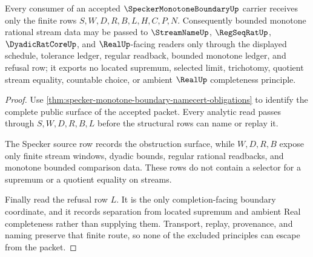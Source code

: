 \begin{theorem}
\label{thm:specker-monotone-boundary-nonescape}
Every consumer of an accepted $\SpeckerMonotoneBoundaryUp$ carrier receives only the finite rows $S,W,D,R,B,L,H,C,P,N$. Consequently bounded monotone rational stream data may be passed to $\StreamNameUp$, $\RegSeqRatUp$, $\DyadicRatCoreUp$, and $\RealUp$-facing readers only through the displayed schedule, tolerance ledger, regular readback, bounded monotone ledger, and refusal row; it exports no located supremum, selected limit, trichotomy, quotient stream equality, countable choice, or ambient $\RealUp$ completeness principle.
\end{theorem}
\begin{proof}
Use \autoref{thm:specker-monotone-boundary-namecert-obligations} to identify the complete public surface of the accepted packet. Every analytic read passes through $S,W,D,R,B,L$ before the structural rows can name or replay it.

The Specker source row records the obstruction surface, while $W,D,R,B$ expose only finite stream windows, dyadic bounds, regular rational readbacks, and monotone bounded comparison data. These rows do not contain a selector for a supremum or a quotient equality on streams.

Finally read the refusal row $L$. It is the only completion-facing boundary coordinate, and it records separation from located supremum and ambient Real completeness rather than supplying them. Transport, replay, provenance, and naming preserve that finite route, so none of the excluded principles can escape from the packet.
\end{proof}




